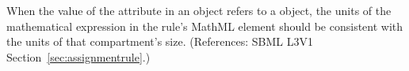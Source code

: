 When the value of the attribute  in an \AssignmentRule
object refers to a \Compartment object, the units of the mathematical
expression in the rule's MathML  element should be consistent
with the units of that compartment's size.  (References: SBML L3V1
Section~\ref{sec:assignmentrule}.)
